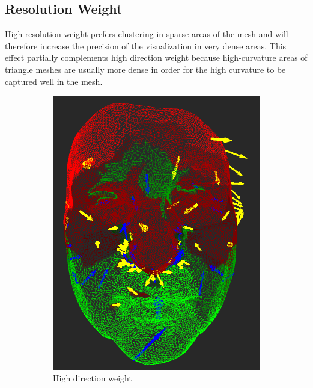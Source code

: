 \subsection{Resolution Weight}

High resolution weight prefers clustering in sparse areas of the mesh and will therefore increase the precision of the visualization in very dense areas. This effect partially complements high direction weight because high-curvature areas of triangle meshes are usually more dense in order for the high curvature to be captured well in the mesh.

\begin{figure}[h]
\centering
	\begin{subfigure}{0.3\textwidth}
	\includegraphics[width=\textwidth]{./img/meshdiff-high_direction.PNG}
	\caption{High direction weight}
	\label{fig:meshdiff_high_direction}
	\end{subfigure}
    \qquad
    \begin{subfigure}{0.3\textwidth}

\end{subfigure}
\end{figure}
